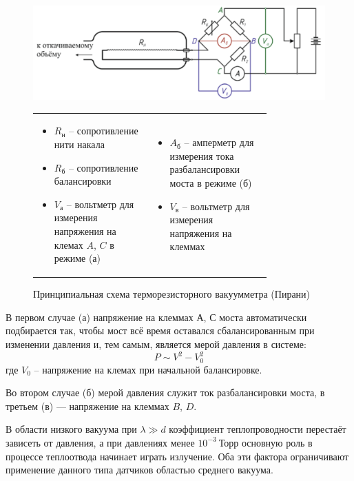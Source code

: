 \documentclass[a4paper,12pt]{article}
\theoremstyle{plain} %
\theoremstyle{definition} %
\theoremstyle{remark} %
\begin{document}
\begin{figure}[H]
	\begin{center}
		\includegraphics[width=\linewidth]{4}
		\begin{tabular}{p{0.4\linewidth} p{0.4\linewidth}}
			\begin{itemize}
				\item $R_\text{н}$ -- сопротивление нити накала
				\item $R_\text{б}$ -- сопротивление балансировки
				\item $V_\text{а}$ -- вольтметр для измерения напряжения на клемах $A$, $C$ в режиме (а)
			\end{itemize}  &
			\begin{itemize}
				\setcounter{enumi}{3}
				\item $A_\text{б}$ -- амперметр для измерения тока разбалансировки моста в режиме (б)
				\item $V_\text{в}$ -- вольтметр для измерения напряжения на клеммах 
			\end{itemize} 
		\end{tabular}
		\caption {Принципиальная схема терморезисторного вакуумметра (Пирани) }
	\end{center}
\end{figure}

В первом случае (а) напряжение на клеммах $А$, $С$ моста автоматически подбирается так, чтобы мост всё время оставался сбалансированным при изменении давления и, тем самым, является мерой давления в системе:
\[P\sim V^2 -V_0^2 \]
где $V_0$ -- напряжение на клемах при начальной балансировке.

Во втором случае (б) мерой давления служит ток разбалансировки моста, в третьем (в) — напряжение на клеммах $B$, $D$.

В области низкого вакуума при $\lambda \gg d$ коэффициент теплопроводности перестаёт зависеть от давления, а при давлениях менее $10^{-3}\ \text{Торр}$ основную роль в процессе теплоотвода начинает играть излучение. Оба эти фактора ограничивают применение данного типа датчиков областью среднего вакуума.
\end{document}
